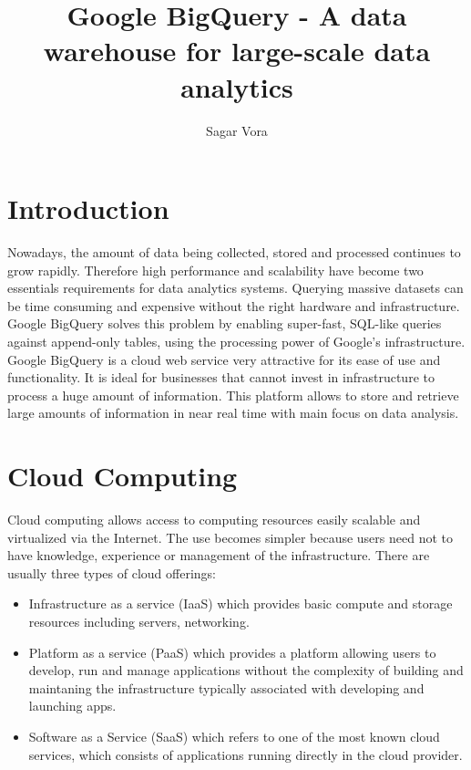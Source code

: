 \documentclass[9pt,twocolumn,twoside]{../../styles/osajnl}
\title{Google BigQuery - A data warehouse for large-scale data analytics}
\author[1]{Sagar Vora}
\affil[1]{School of Informatics and Computing, Bloomington, IN 47408, U.S.A.}
\begin{document}
\maketitle

\section{Introduction}
Nowadays, the amount of data being collected, stored and processed
continues to grow rapidly. Therefore high performance and scalability
have become two essentials requirements for data analytics
systems. Querying massive datasets can be time consuming and expensive
without the right hardware and infrastructure. Google BigQuery solves
this problem by enabling super-fast, SQL-like queries against
append-only tables, using the processing power of Google's
infrastructure. Google BigQuery \cite{www-bigquery}
\cite{bigquery-paper} is a cloud web service very attractive for its
ease of use and functionality. It is ideal for businesses that cannot
invest in infrastructure to process a huge amount of information. This
platform allows to store and retrieve large amounts of information in
near real time with main focus on data analysis.

\section{Cloud Computing}
Cloud computing \cite{www-cloudcomputing}
\cite{benchmark-for-cloud-paper} allows access to computing resources
easily scalable and virtualized via the Internet. The use becomes
simpler because users need not to have knowledge, experience or
management of the infrastructure. There are usually three types of
cloud offerings:\begin{itemize} \item Infrastructure as a service
  (IaaS) which provides basic compute and storage resources including
  servers, networking. \item Platform as a service (PaaS) which
  provides a platform allowing users to develop, run and manage
  applications without the complexity of building and maintaning the
  infrastructure typically associated with developing and launching
  apps. \item Software as a Service (SaaS) which refers to one of the
  most known cloud services, which consists of applications running
  directly in the cloud provider. \end{itemize}

\noindent
\end{document}
